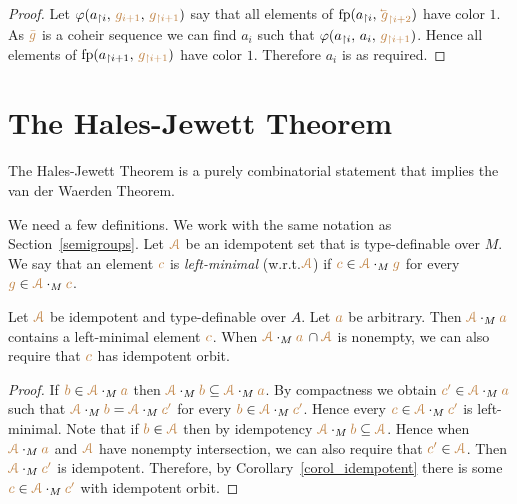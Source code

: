 \begin{proof}
Let $\varphi(a_{\restriction i},\,{\color{brown} g_{i+1}},\,{\color{brown} g_{\restriction i+1}})$ 
say that all elements of $\fp(a_{\restriction i},\,{\mr\cev{g}_{\restriction i+2}})$ have color $1$.
%
As ${\color{brown}\bar g}$ is a coheir sequence we can find  $a_i$ 
such that $\varphi(a_{\restriction i},\,a_i,\,{\color{brown} g_{\restriction i+1}})$.
%
Hence all elements of ${\rm fp}(a_{\restriction i+1},\,{\color{brown} g_{\restriction i+1}})$ have color $1$.
%
Therefore $a_i$ is as required.
\end{proof}

\section{The Hales-Jewett Theorem}
\label{HJ}

The Hales-Jewett Theorem is a purely combinatorial statement 
that implies the van der Waerden Theorem.

We need a few definitions.
We work with the same notation as Section~\ref{semigroups}.
Let ${\color{brown}\EuScript A}$ be an idempotent set that is type-definable over $M$.
We say that an element ${\color{brown} c}$ is \emph{left-minimal\/} (w.r.t.\@ ${\color{brown}\EuScript A}$) if 
${\color{brown} c}\in{\color{brown}\EuScript A}\cdot_M{\color{brown} g}$ for every ${\color{brown} g}\in{\color{brown}\EuScript A}\cdot_M{\color{brown} c}$.

\begin{proposition}\label{prop_minimal_existence1}
Let ${\color{brown}\EuScript A}$ be idempotent and type-definable over $A$.
Let ${\color{brown} a}$ be arbitrary.
Then ${\color{brown}\EuScript A}\cdot_M{\color{brown} a}$ contains a left-minimal element ${\color{brown} c}$.
When ${\color{brown}\EuScript A}\cdot_M{\color{brown} a}\,\cap{\color{brown}\EuScript A}$ is nonempty, we can also require that ${\color{brown} c}$ has idempotent orbit.
\end{proposition}
\begin{proof}
If ${\color{brown} b}\in{\color{brown}\EuScript A}\cdot_M{\color{brown} a}$ then ${\color{brown}\EuScript A}\cdot_M{\color{brown} b}\subseteq{\color{brown}\EuScript A}\cdot_M{\color{brown} a}$.
By compactness we obtain ${\color{brown} c'}\in{\color{brown}\EuScript A}\cdot_M{\color{brown} a}$ such that ${\color{brown}\EuScript A}\cdot_M{\color{brown} b}={\color{brown}\EuScript A}\cdot_M{\color{brown} c'}$ for every ${\color{brown} b}\in{\color{brown}\EuScript A}\cdot_M{\color{brown} c'}$.
Hence every ${\color{brown} c}\in{\color{brown}\EuScript A}\cdot_M{\color{brown} c'}$ is left-minimal.
Note that if ${\color{brown} b}\in{\color{brown}\EuScript A}$ then by idempotency  ${\color{brown}\EuScript A}\cdot_M{\color{brown} b}\subseteq{\color{brown}\EuScript A}$. Hence when ${\color{brown}\EuScript A}\cdot_M{\color{brown} a}$ and ${\color{brown}\EuScript A}$ have nonempty intersection, we can also require that ${\color{brown} c'}\in{\color{brown}\EuScript A}$. 
Then ${\color{brown}\EuScript A}\cdot_M{\color{brown} c'}$ is idempotent. 
Therefore, by Corollary~\ref{corol_idempotent} there is some ${\color{brown} c}\in{\color{brown}\EuScript A}\cdot_M{\color{brown} c'}$ with idempotent orbit.
\end{proof}

